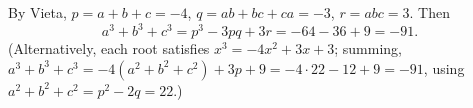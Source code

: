 By Vieta, $p=a+b+c=-4$, $q=ab+bc+ca=-3$, $r=abc=3$. Then
\[
a^3+b^3+c^3=p^3-3pq+3r=-64-36+9=\boxed{-91}.
\]
(Alternatively, each root satisfies $x^3=-4x^2+3x+3$; summing, $a^3+b^3+c^3=-4(a^2+b^2+c^2)+3p+9=-4\cdot22-12+9=-91$, using $a^2+b^2+c^2=p^2-2q=22$.)
